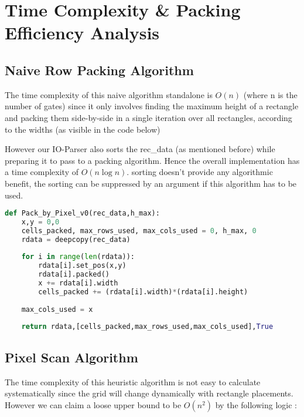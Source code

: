 \documentclass[12pt, a4paper,openany]{article}
\begin{document}
\newpage %

\section{Time Complexity \& Packing Efficiency Analysis}
\subsection{Naive Row Packing Algorithm}
\begin{flushleft}
    The time complexity of this naive algorithm standalone is \(O(n)\) (where n is the number of gates) since it only involves finding the maximum height of a rectangle and packing them side-by-side in a single iteration over all rectangles, according to the widths (as visible in the code below)
\end{flushleft}
\begin{flushleft}
    However our IO-Parser also sorts the rec\_data (as mentioned before) while preparing it to pass to a packing algorithm. Hence the overall implementation has a time complexity of \(O(n\log{n})\).  sorting doesn't provide any algorithmic benefit, the sorting can be suppressed by an argument if this algorithm has to be used.
\end{flushleft}
\begin{lstlisting}[language=Python, caption = Naive Row Algorithm's Python Implementation]
def Pack_by_Pixel_v0(rec_data,h_max):
    x,y = 0,0
    cells_packed, max_rows_used, max_cols_used = 0, h_max, 0
    rdata = deepcopy(rec_data)
    
    for i in range(len(rdata)):
        rdata[i].set_pos(x,y)
        rdata[i].packed()
        x += rdata[i].width
        cells_packed += (rdata[i].width)*(rdata[i].height)
    
    max_cols_used = x
    
    return rdata,[cells_packed,max_rows_used,max_cols_used],True
\end{lstlisting}

\subsection{Pixel Scan Algorithm}
\begin{flushleft}
    The time complexity of this heuristic algorithm is not easy to calculate systematically since the grid will change dynamically with rectangle placements. However we can claim a loose upper bound to be \(O(n^{2})\) by the following logic :
\end{flushleft}
\end{document}
